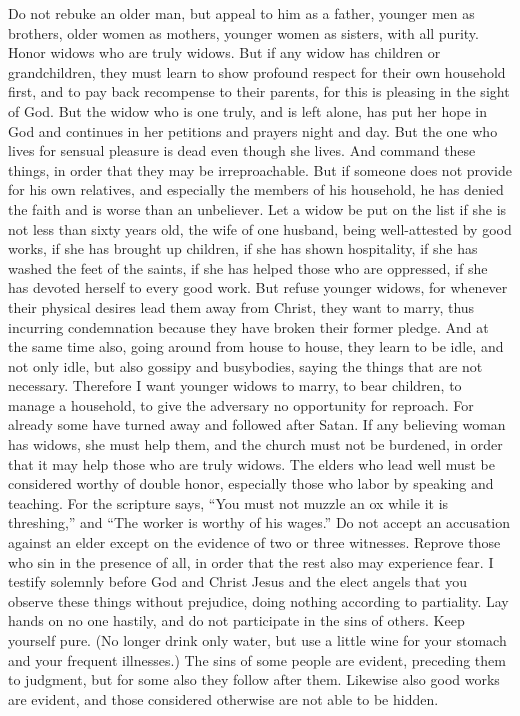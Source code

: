 \begin{biblechapter} %
 Do not rebuke an older man, but appeal to him as a father, younger men as brothers,
\verse older women as mothers, younger women as sisters, with all purity.
\verse Honor widows who are truly widows.
\verse But if any widow has children or grandchildren, they must learn to show profound respect for their own household first, and to pay back recompense to their parents, for this is pleasing in the sight of God.
\verse But the widow who is one truly, and is left alone, has put her hope in God and continues in her petitions and prayers night and day.
\verse But the one who lives for sensual pleasure is dead even though she lives.
\verse And command these things, in order that they may be irreproachable.
\verse But if someone does not provide for his own relatives, and especially the members of his household, he has denied the faith and is worse than an unbeliever.
\verse Let a widow be put on the list if she is not less than sixty years old, the wife of one husband,
\verse being well-attested by good works, if she has brought up children, if she has shown hospitality, if she has washed the feet of the saints, if she has helped those who are oppressed, if she has devoted herself to every good work.
\verse But refuse younger widows, for whenever their physical desires lead them away from Christ, they want to marry,
\verse thus incurring condemnation because they have broken their former pledge.
\verse And at the same time also, going around from house to house, they learn to be idle, and not only idle, but also gossipy and busybodies, saying the things that are not necessary.
\verse Therefore I want younger widows to marry, to bear children, to manage a household, to give the adversary no opportunity for reproach.
\verse For already some have turned away and followed after Satan.
\verse If any believing woman has widows, she must help them, and the church must not be burdened, in order that it may help those who are truly widows.
 The elders who lead well must be considered worthy of double honor, especially those who labor by speaking and teaching.
\verse For the scripture says, “You must not muzzle an ox while it is threshing,” and “The worker is worthy of his wages.”
\verse Do not accept an accusation against an elder except on the evidence of two or three witnesses.
\verse Reprove those who sin in the presence of all, in order that the rest also may experience fear.
\verse I testify solemnly before God and Christ Jesus and the elect angels that you observe these things without prejudice, doing nothing according to partiality.
\verse Lay hands on no one hastily, and do not participate in the sins of others. Keep yourself pure.
\verse (No longer drink only water, but use a little wine for your stomach and your frequent illnesses.)
\verse The sins of some people are evident, preceding them to judgment, but for some also they follow after them.
\verse Likewise also good works are evident, and those considered otherwise are not able to be hidden.
\end{biblechapter}


